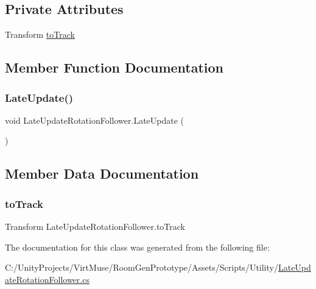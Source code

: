 \subsection*{Private Attributes}
\begin{DoxyCompactItemize}
\item 
Transform \mbox{\hyperlink{class_late_update_rotation_follower_a8421f97a652a361093702b1e39752bfb}{to\+Track}}
\end{DoxyCompactItemize}


\subsection{Member Function Documentation}
\mbox{\label{class_late_update_rotation_follower_a038bf88fd7c04d016cd03292e2e7a180}} 
\subsubsection{\texorpdfstring{Late\+Update()}{LateUpdate()}}
{\footnotesize\ttfamily void Late\+Update\+Rotation\+Follower.\+Late\+Update (\begin{DoxyParamCaption}{ }\end{DoxyParamCaption})\hspace{0.3cm}{\ttfamily [private]}}



\subsection{Member Data Documentation}
\mbox{\label{class_late_update_rotation_follower_a8421f97a652a361093702b1e39752bfb}} 
\subsubsection{\texorpdfstring{to\+Track}{toTrack}}
{\footnotesize\ttfamily Transform Late\+Update\+Rotation\+Follower.\+to\+Track\hspace{0.3cm}{\ttfamily [private]}}



The documentation for this class was generated from the following file\+:\begin{DoxyCompactItemize}
\item 
C\+:/\+Unity\+Projects/\+Virt\+Muse/\+Room\+Gen\+Prototype/\+Assets/\+Scripts/\+Utility/\mbox{\hyperlink{_late_update_rotation_follower_8cs}{Late\+Update\+Rotation\+Follower.\+cs}}\end{DoxyCompactItemize}
